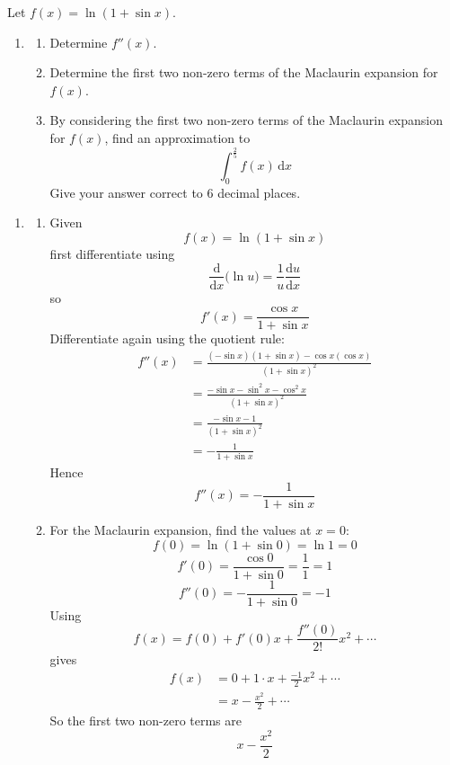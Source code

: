 \documentclass[leqno]{article}
\begin{document}
\begin{enumerate}[
  label=\textbf{\arabic*.},
  leftmargin=*,
  topsep=0pt,
  partopsep=0pt,
  parsep=0pt
]
Let $f(x)=\ln(1+\sin x)$. \\
\begin{enumerate}[label=\textbf{(\alph*)}]
  \item
  \begin{enumerate}[label=(\roman*)]
    \item Determine $f''(x)$. 
    \item Determine the first two non-zero terms of the Maclaurin expansion for $f(x)$. 
    \item By considering the first two non-zero terms of the Maclaurin expansion for $f(x)$, find an approximation to
    \[
    \int_0^{\frac{2}{5}} f(x)\,\mathrm{d}x
    \]
    Give your answer correct to $6$ decimal places.  \\
  \end{enumerate}
\end{enumerate}

\vspace*{30pt}

\begin{tcolorbox}[colback=white, colframe=scarlet, title={\textbf{Solution}}, breakable, grow to left by=6mm, grow to right by=10mm]
\begin{enumerate}[label=\textbf{(\alph*)}]
  \item
  \begin{enumerate}[label=(\roman*)]
    \item
    Given
    \[
    f(x)=\ln(1+\sin x)
    \]
    first differentiate using
    \[
    \frac{\mathrm{d}}{\mathrm{d}x}\bigl(\ln u\bigr)=\frac{1}{u}\frac{\mathrm{d}u}{\mathrm{d}x}
    \]
    so
    \[
    f'(x)=\frac{\cos x}{1+\sin x}
    \]
    Differentiate again using the quotient rule:
    \begin{align*}
    f''(x)
    &=\frac{(-\sin x)(1+\sin x)-\cos x(\cos x)}{(1+\sin x)^2} \\
    &=\frac{-\sin x-\sin^2x-\cos^2x}{(1+\sin x)^2} \\
    &=\frac{-\sin x-1}{(1+\sin x)^2} \\
    &=-\frac{1}{1+\sin x}
    \end{align*}
    Hence
    \[
    f''(x)=-\frac{1}{1+\sin x}
    \]

    \item
    For the Maclaurin expansion, find the values at \(x=0\):
    \[
    f(0)=\ln(1+\sin 0)=\ln 1=0
    \]
    \[
    f'(0)=\frac{\cos 0}{1+\sin 0}=\frac{1}{1}=1
    \]
    \[
    f''(0)=-\frac{1}{1+\sin 0}=-1
    \]
    Using
    \[
    f(x)=f(0)+f'(0)x+\frac{f''(0)}{2!}x^2+\cdots
    \]
    gives
    \begin{align*}
    f(x)
    &=0+1\cdot x+\frac{-1}{2}x^2+\cdots \\
    &=x-\frac{x^2}{2}+\cdots
    \end{align*}
    So the first two non-zero terms are
    \[
    x-\frac{x^2}{2}
    \]


\end{enumerate}
\end{enumerate}
\end{tcolorbox}
\end{enumerate}
\end{document}
